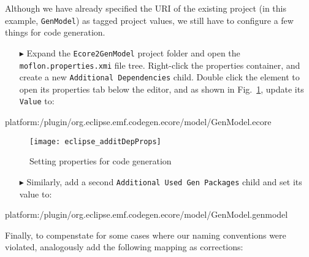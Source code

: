 Although we have already specified the URI of the existing project (in this example, \texttt{GenModel}) as tagged project values, we still have to 
configure a few things for code generation.

\begin{enumerate}
  
\item[$\blacktriangleright$] Expand the \texttt{Ecore2GenModel} project folder and open the \texttt{mof\-lon.\-prop\-er\-ties.\-xmi} file tree. Right-click the
properties container, and create a new \texttt{Add\-it\-ion\-al Dep\-en\-den\-cies} child. Double click the element to open its properties tab below the
editor, and as shown in Fig.~\ref{eclipse:addDepChild}, update its \texttt{Value} to:\\
\end{enumerate}

\vspace{-1cm}
{\small \ttfamily  platform:/plugin/org.eclipse.emf.codegen.ecore/model/GenModel.ecore} \\
\vspace{-0.5cm}

\begin{figure}[htbp]
\begin{centering}
\texttt{[image: eclipse\_additDepProps]}
  \caption{Setting properties for code generation}  
  \label{eclipse:addDepChild}
\end{centering}
\end{figure} 

\begin{enumerate}

\item[$\blacktriangleright$] Similarly, add a second \texttt{Additional Used Gen Packages} child and set its value to: \\
\end{enumerate}

\vspace{-1cm}
{\small \ttfamily platform:\-/\-plugin/\-org.\-eclipse.\-emf.\-codegen.\-ecore/\-model/\-GenModel.\-genmodel}

\newpage
Finally, to compenstate for some cases where our naming conventions were violated, analogously add the following mapping as corrections:

